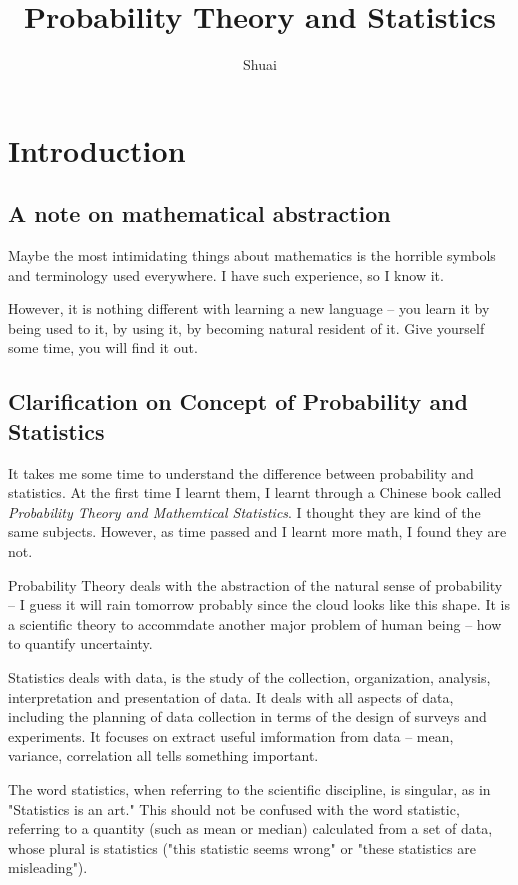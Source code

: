 \documentclass[a4paper]{book}
\title{Probability Theory and Statistics}
\author{Shuai}
\date{}
\newenvironment{remark}[1][Remark]{\begin{trivlist}
\item[\hskip \labelsep {\bfseries #1}]}{\end{trivlist}}
\begin{document}
\maketitle
\tableofcontents
\pagebreak

\chapter{Introduction}

\section{A note on mathematical abstraction}

	Maybe the most intimidating things about mathematics is the horrible
	symbols and terminology used everywhere. I have such experience, so I
	know it.

	However, it is nothing different with learning a new language -- you
	learn it by being used to it, by using it, by becoming natural
	resident of it. Give yourself some time, you will find it out.

\section{Clarification on Concept of Probability and Statistics}

	It takes me some time to understand the difference between probability
	and statistics. At the first time I learnt them, I learnt through a
	Chinese book called \textit{Probability Theory and Mathemtical
	Statistics}. I thought they are kind of the same subjects. However, as
	time passed and I learnt more math, I found they are not.

	Probability Theory deals with the abstraction of the natural sense of
	probability -- I guess it will rain tomorrow probably since the cloud
	looks like this shape. It is a scientific theory to accommdate another
	major problem of human being -- how to quantify uncertainty.

	Statistics deals with data, is the study of the collection,
	organization, analysis, interpretation and presentation of data.  It
	deals with all aspects of data, including the planning of data
	collection in terms of the design of surveys and
	experiments.\cite{wiki_statistics} It focuses on extract useful
	imformation from data -- mean, variance, correlation all tells
	something important.

	\begin{remark}
		The word statistics, when referring to the scientific discipline, is
		singular, as in "Statistics is an art." This should not be confused
		with the word statistic, referring to a quantity (such as mean or
		median) calculated from a set of data, whose plural is statistics
		("this statistic seems wrong" or "these statistics are
		misleading").\cite{wiki_statistics}
	\end{remark}
\end{document}
